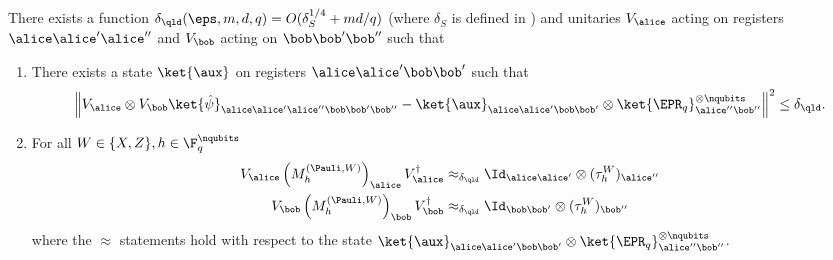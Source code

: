 \begin{lemma}
\label{lem:qld-unitary}
There exists a function $\delta_\qld(\eps,m,d,q) = O(\delta_S^{1/4} + md/q)$ (where $\delta_S$ is defined in ) and unitaries $V_\alice$ acting on registers $\alice \alice' \alice''$ and $V_\bob$ acting on $\bob \bob' \bob''$ such that 
\begin{enumerate}
	\item There exists a state $\ket{\aux}$ on registers $\alice \alice' \bob \bob'$ such that
	\[
		\left \| V_\alice \otimes V_\bob \ket{\hat{\psi}}_{\alice \alice' \alice'' \bob \bob' \bob''} - \ket{\aux}_{\alice \alice' \bob \bob'} \otimes \ket{\EPR_q}^{\otimes \nqubits}_{\alice'' \bob''} \right \|^2 \leq \delta_\qld.
	\]
	
	\item For all $W \in \{X,Z\}, h \in \F_q^\nqubits$
	\begin{align*}
		V_\alice \, \Big(M^{(\Pauli,W)}_h \Big)_{\alice} \, V_\alice^\dagger &\approx_{\delta_\qld} \Id_{\alice \alice'} \otimes (\tau^W_h)_{\alice''} \\
		 V_\bob \, \Big(M^{(\Pauli,W)}_h  \Big)_{\bob}\, V_\bob^\dagger &\approx_{\delta_\qld} \Id_{\bob \bob'} \otimes (\tau^W_h)_{\bob''}
	\end{align*}
	where the $\approx$ statements hold with respect to the state $\ket{\aux}_{\alice \alice' \bob \bob'} \otimes \ket{\EPR_q}^{\otimes \nqubits}_{\alice'' \bob''}$. 
\end{enumerate}
\end{lemma}

